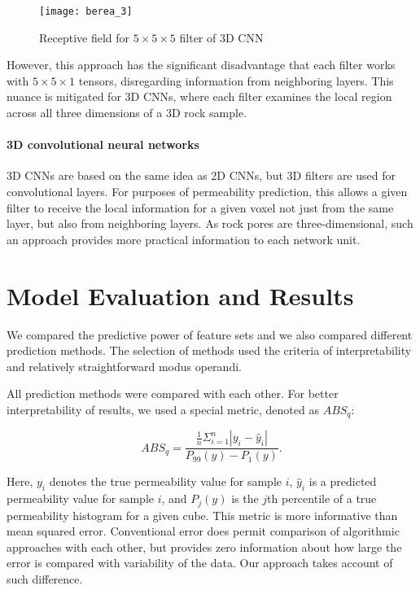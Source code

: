\documentclass[review]{elsarticle}
\begin{document}
\begin{wrapfigure}{l}{0.5\textwidth}
    \centering
    \texttt{[image: berea\_3]}
    \caption{Receptive field for $5 \times 5 \times 5$ filter of 3D CNN}
\end{wrapfigure}

However, this approach has the significant disadvantage that each filter works with $5 \times 5 \times 1$ tensors, disregarding information from neighboring layers. This nuance is mitigated for 3D CNNs, where each filter examines the local region across all three dimensions of a 3D rock sample.

\paragraph{3D convolutional neural networks}

3D CNNs are based on the same idea as 2D CNNs, but 3D filters are used for convolutional layers. For purposes of permeability prediction, this allows a given filter to receive the local information for a given voxel not just from the same layer, but also from neighboring layers. As rock pores are three-dimensional, such an approach provides more practical information to each network unit.

\section{Model Evaluation and Results}

We compared the predictive power of feature sets and we also compared different prediction methods. The selection of methods used the criteria of interpretability and relatively straightforward modus operandi.

 	All prediction methods were compared with each other. For better interpretability of results, we used a special metric, denoted as $ABS_q:$
    
$$ABS_q = \frac{\frac{1}{n}\Sigma_{i=1}^n |y_i - \hat{y}_i|}{P_{99}(y)-P_{1}(y)}. $$

Here, $y_i$ denotes the true permeability value for sample $i$, $\hat{y}_i$ is a predicted permeability value for sample $i$, and $P_j(y)$ is the $j$th percentile of a true permeability histogram for a given cube. This metric is more informative than mean squared error. Conventional error does permit comparison of algorithmic approaches with each other, but provides zero information about how large the error is compared with variability of the data. Our approach takes account of such difference.
\end{document}
